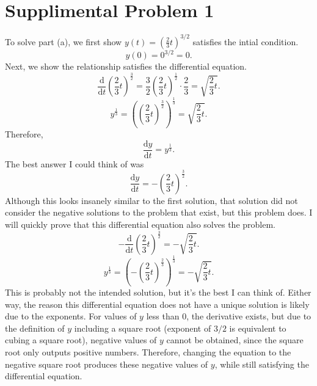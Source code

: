 \documentclass[11pt, letterpaper]{report}
\begin{document}
\section*{Supplimental Problem 1}
\begin{solution}
To solve part (a), we first show $y(t)=\left( \frac{2}{3}t \right) ^{3/2}$ satisfies the intial condition.
\[
	y(0)=0^{3/2}=0
.\]
Next, we show the relationship satisfies the differential equation.
\[
	\frac{\mathrm{d}}{\mathrm{d}t} \left( \frac{2}{3}t \right) ^{\frac{3}{2}}=\frac{3}{2}\left( \frac{2}{3}t \right) ^{\frac{1}{2}}\cdot \frac{2}{3}=\sqrt{\frac{2}{3}t} 
.\]
\[
	y^{\frac{1}{3}}=\left( \left( \frac{2}{3}t \right) ^{\frac{3}{2}} \right) ^{\frac{1}{3}}=\sqrt{\frac{2}{3}t} 
.\]
Therefore,
\[
	\frac{\mathrm{d}y}{\mathrm{d}t} =y^{\frac{1}{3}}
.\]
The best answer I could think of was
\[
	\frac{\mathrm{d}y}{\mathrm{d}t} =-\left( \frac{2}{3}t \right) ^{\frac{3}{2}}	
.\]
Although this looks insanely similar to the first solution, that solution did not consider the negative solutions to the problem that exist, but this problem does. I will quickly prove that this differential equation also solves the problem.
\[
	-\frac{\mathrm{d}}{\mathrm{d}t} \left( \frac{2}{3}t \right) ^{\frac{3}{2}}=-\sqrt{\frac{2}{3}t} 
.\]
\[
	y^{\frac{1}{3}}=\left( -\left( \frac{2}{3}t \right) ^{\frac{2}{3}} \right) ^{\frac{1}{3}}=-\sqrt{\frac{2}{3}t}
.\]
This is probably not the intended solution, but it's the best I can think of. Either way, the reason this differential equation does not have a unique solution is likely due to the exponents. For values of $y$ less than $0$, the derivative exists, but due to the definition of $y$ including a square root (exponent of $3/2$ is equivalent to cubing a square root), negative values of $ y$ cannot be obtained, since the square root only outputs positive numbers. Therefore, changing the equation to the negative square root produces these negative values of $y$, while still satisfying the differential equation.
\end{solution}
\end{document}
